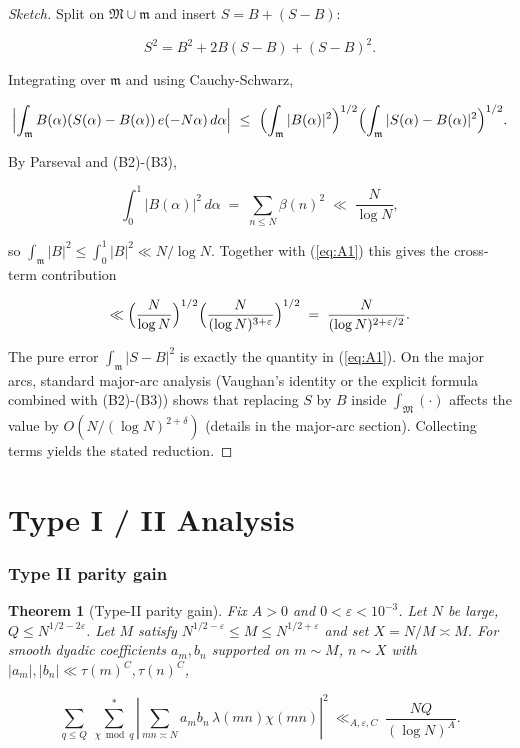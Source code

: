 \documentclass[11pt]{article}
\def\eqref#1{(\ref{#1})}%
\newtheorem{theorem}[lemma]{Theorem}
\theoremstyle{definition}
\theoremstyle{remark}
\numberwithin{equation}{part}
\begin{document}
\begin{proof}[Sketch]
	Split on $\mathfrak M\cup\mathfrak m$ and insert $S=B+(S-B)$:

	$$
		S^2 = B^2 + 2B(S-B) + (S-B)^2.
	$$

	Integrating over $\mathfrak m$ and using Cauchy-Schwarz,

	$$
		\Bigl|\int_{\mathfrak m} B(\alpha)(S(\alpha)-B(\alpha))\,e(-N\alpha)\,d\alpha\Bigr|
		\ \le\ \Bigl(\int_{\mathfrak m}|B(\alpha)|^2\Bigr)^{1/2}
		\Bigl(\int_{\mathfrak m}|S(\alpha)-B(\alpha)|^2\Bigr)^{1/2}.
	$$

	By Parseval and (B2)-(B3),

	$$
		\int_0^1 |B(\alpha)|^2\,d\alpha \;=\; \sum_{n\le N}\beta(n)^2 \;\ll\; \frac{N}{\log N},
	$$

	so $\int_{\mathfrak m}|B|^2\le\int_0^1|B|^2\ll N/\log N$. Together with \eqref{eq:A1} this gives the cross-term contribution

	$$
		\ll \Bigl(\frac{N}{\log N}\Bigr)^{1/2}\Bigl(\frac{N}{(\log N)^{3+\varepsilon}}\Bigr)^{1/2}
		\;=\;\frac{N}{(\log N)^{2+\varepsilon/2}}.
	$$

	The pure error $\int_{\mathfrak m}|S-B|^2$ is exactly the quantity in \eqref{eq:A1}. On the major arcs, standard major-arc analysis (Vaughan's identity or the explicit formula combined with (B2)-(B3)) shows that replacing $S$ by $B$ inside $\int_{\mathfrak M}(\cdot)$ affects the value by $O(N/(\log N)^{2+\delta})$ (details in the major-arc section). Collecting terms yields the stated reduction.
\end{proof}

\part{Type I / II Analysis}

\section{Type II parity gain}

\begin{theorem}[Type-II parity gain]
	Fix $A>0$ and $0<\varepsilon<10^{-3}$. Let $N$ be large, $Q\le N^{1/2-2\varepsilon}$. Let $M$ satisfy $N^{1/2-\varepsilon}\le M\le N^{1/2+\varepsilon}$ and set $X=N/M\asymp M$. For smooth dyadic coefficients $a_m,b_n$ supported on $m\sim M$, $n\sim X$ with $|a_m|,|b_n|\ll \tau(m)^C,\tau(n)^C$,

	$$
		\sum_{q\le Q}\ \sum_{\chi\bmod q}^{\!*}
		\left|\sum_{mn\asymp N} a_m b_n\,\lambda(mn)\chi(mn)\right|^2
		\ \ll_{A,\varepsilon,C}\ \frac{NQ}{(\log N)^{A}}.
	$$
\end{theorem}
\end{document}
